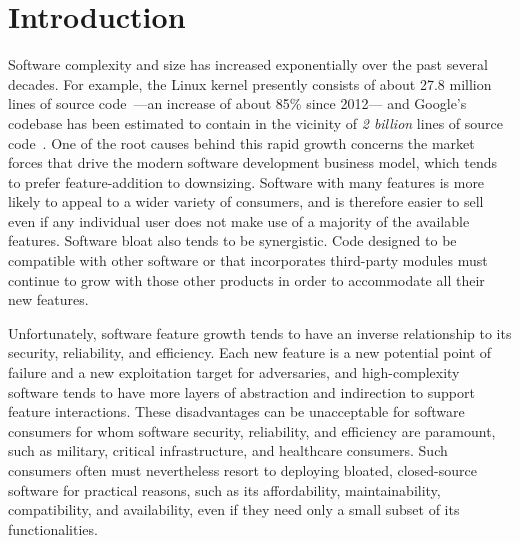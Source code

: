 \documentclass[sigconf]{acmart}
\begin{document}

\maketitle

\section{Introduction}

Software complexity and size has increased exponentially over the past several decades.
For example, the Linux kernel presently consists of about 27.8 million lines of source code~\cite{bhartiya}---an increase of about 85\% since 2012---%
and Google's codebase has been estimated to contain in the vicinity of \emph{2 billion} lines of source code~\cite{potvin}.
One of the root causes behind this rapid growth concerns the market forces that drive the modern software development business model,
which tends to prefer feature-addition to downsizing.
Software with many features is more likely to appeal to a wider variety of consumers, and is therefore easier to sell even if any individual user does not make use of a majority of the available features.
Software bloat also tends to be synergistic.
Code designed to be compatible with other software or that incorporates third-party modules must continue to grow with those other products in order to accommodate all their new features.

Unfortunately, software feature growth tends to have an inverse relationship to its security, reliability, and efficiency.
Each new feature is a new potential point of failure and a new exploitation target for adversaries,
and high-complexity software tends to have more layers of abstraction and indirection to support feature interactions.
These disadvantages can be unacceptable for software consumers for whom software security, reliability, and efficiency are paramount,
such as military, critical infrastructure, and healthcare consumers.
Such consumers often must nevertheless resort to deploying bloated, closed-source software for practical reasons,
such as its affordability, maintainability, compatibility, and availability,
even if they need only a small subset of its functionalities.
\end{document}
